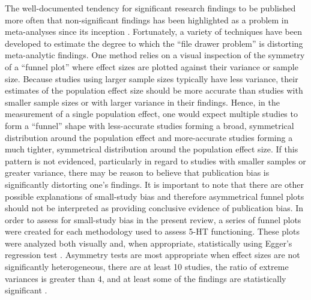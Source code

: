 The well-documented tendency for significant research findings to be published more often that non-significant findings has been highlighted as a problem in meta-analyses since its inception \parencite[see][]{Sutton09}. Fortunately, a variety of techniques have been developed to estimate the degree to which the ``file drawer problem'' \parencite[][638]{Rosenthal79} is distorting meta-analytic findings. One method relies on a visual inspection of the symmetry of a ``funnel plot'' where effect sizes are plotted against their variance or sample size. Because studies using larger sample sizes typically have less variance, their estimates of the population effect size should be more accurate than studies with smaller sample sizes or with larger variance in their findings.  Hence, in the measurement of a single population effect, one would expect multiple studies to form a ``funnel'' shape with less-accurate studies forming a broad, symmetrical distribution around the population effect and more-accurate studies forming a much tighter, symmetrical distribution around the population effect size. If this pattern is not evidenced, particularly in regard to studies with smaller samples or greater variance, there may be reason to believe that publication bias is significantly distorting one's findings. It is important to note that there are other possible explanations of small-study bias and therefore asymmetrical funnel plots should not be interpreted as providing conclusive evidence of publication bias. In order to assess for small-study bias in the present review, a series of funnel plots were created for each methodology used to assess 5-HT functioning. These plots were analyzed both visually and, when appropriate, statistically using Egger's regression test \parencite{Egger97}. Asymmetry tests are most appropriate when effect sizes are not significantly heterogeneous, there are at least 10 studies, the ratio of extreme variances is greater than 4, and at least some of the findings are statistically significant \parencite{Ioannidis2007}.


% 

